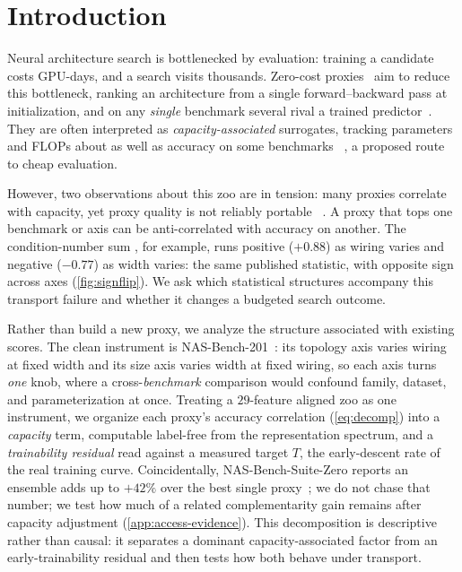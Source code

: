 \section{Introduction}
\label{sec:intro}


Neural architecture search is bottlenecked by evaluation: training a candidate
costs GPU-days, and a search visits thousands. Zero-cost
proxies~\cite{abdelfattah2021zerocost} aim to reduce this bottleneck, ranking
an architecture from a single forward--backward pass at initialization, and on any
\emph{single} benchmark several rival a trained predictor~\cite{krishnakumar2022nbsz}.
They are often interpreted as \emph{capacity-associated} surrogates, tracking
parameters and FLOPs about as well as accuracy on some benchmarks
~\cite{ning2021evaluating,white2021powerful,kadlecova2024graf}, a proposed route
to cheap evaluation.

However, two observations about this zoo are in tension: many proxies correlate
with capacity, yet proxy quality is not reliably portable
~\cite{ning2021evaluating,white2021powerful,krishnakumar2022nbsz}. A proxy that
tops one benchmark or axis can be anti-correlated with accuracy on another. The
condition-number sum , for example,
runs positive ($+0.88$) as wiring varies and negative ($-0.77$)
as width varies: the same published statistic, with opposite sign across axes
(\cref{fig:signflip}). We ask which statistical structures accompany this
transport failure and whether it changes a budgeted search outcome.

Rather than build a new proxy, we analyze the structure associated with existing
scores. The clean instrument is NAS-Bench-201~\cite{dong2021natsbench}:
its topology axis varies wiring at fixed width and its size axis varies width at
fixed wiring, so each axis turns \emph{one} knob, where a cross-\emph{benchmark}
comparison would confound family, dataset, and parameterization at once. Treating
a $29$-feature aligned zoo as one instrument, we organize each proxy's accuracy correlation
(\cref{eq:decomp}) into a \emph{capacity} term, computable label-free from the
representation spectrum, and a \emph{trainability residual} read against a measured
target $T$, the early-descent rate of the real training curve. Coincidentally,
NAS-Bench-Suite-Zero reports an ensemble adds up to $+42\%$ over the best single
proxy~\cite{krishnakumar2022nbsz}; we do not chase that number; we test how much
of a related complementarity gain remains after capacity adjustment
(\cref{app:access-evidence}). This decomposition is descriptive rather
than causal: it separates a dominant capacity-associated factor from an
early-trainability residual and then tests how both behave under transport.

